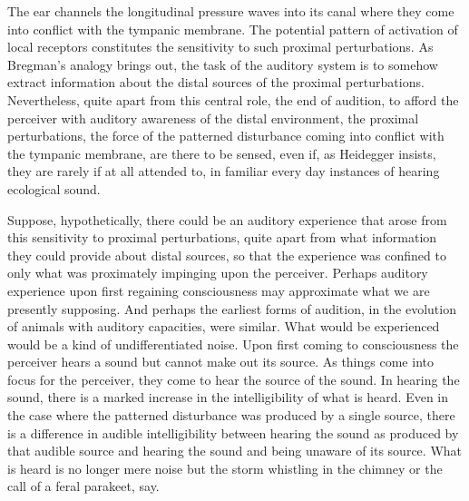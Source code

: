 The ear channels the longitudinal pressure waves into its canal where they come into conflict with the tympanic membrane. The potential pattern of activation of local receptors constitutes the sensitivity to such proximal perturbations. As Bregman's analogy brings out, the task of the auditory system is to somehow extract information about the distal sources of the proximal perturbations. Nevertheless, quite apart from this central role, the end of audition, to afford the perceiver with auditory awareness of the distal environment, the proximal perturbations, the force of the patterned disturbance coming into conflict with the tympanic membrane, are there to be sensed, even if, as Heidegger insists, they are rarely if at all attended to, in familiar every day instances of hearing ecological sound.

Suppose, hypothetically, there could be an auditory experience that arose from this sensitivity to proximal perturbations, quite apart from what information they could provide about distal sources, so that the experience was confined to only what was proximately impinging upon the perceiver. Perhaps auditory experience upon first regaining consciousness may approximate what we are presently supposing. And perhaps the earliest forms of audition, in the evolution of animals with auditory capacities, were similar. What would be experienced would be a kind of undifferentiated noise. Upon first coming to consciousness the perceiver hears a sound but cannot make out its source. As things come into focus for the perceiver, they come to hear the source of the sound. In hearing the sound, there is a marked increase in the intelligibility of what is heard. Even in the case where the patterned disturbance was produced by a single source, there is a difference in audible intelligibility between hearing the sound as produced by that audible source and hearing the sound and being unaware of its source. What is heard is no longer mere noise but the storm whistling in the chimney or the call of a feral parakeet, say.

